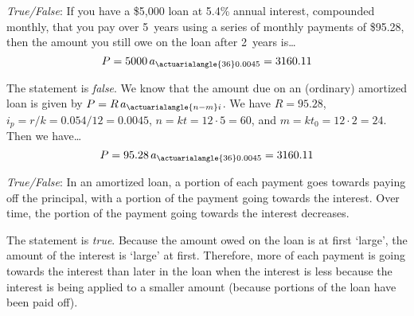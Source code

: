 \documentclass[11pt,letterpaper]{article}
\begin{document}
\newpage



\quizsol \textit{True/False}: If you have a \$5,000 loan at 5.4\% annual interest, compounded monthly, that you pay over 5~years using a series of monthly payments of \$95.28, then the amount you still owe on the loan after 2~years is\dots
	\[
	P= 5000\, a_{\actuarialangle{36}0.0045}= 3160.11
	\] \pspace

\sol The statement is \textit{false}. We know that the amount due on an (ordinary) amortized loan is given by $P= R\, a_{\actuarialangle{n - m}i}$. We have $R= 95.28$, $i_p= r/k= 0.054/12= 0.0045$, $n= kt= 12 \cdot 5= 60$, and $m= kt_0= 12 \cdot 2= 24$. Then we have\dots
	\[
	P= 95.28\, a_{\actuarialangle{36}0.0045}= 3160.11
	\] \pvspace{1.3cm}



\quizsol \textit{True/False}: In an amortized loan, a portion of each payment goes towards paying off the principal, with a portion of the payment going towards the interest. Over time, the portion of the payment going towards the interest decreases. \pspace

\sol The statement is \textit{true}. Because the amount owed on the loan is at first `large', the amount of the interest is `large' at first. Therefore, more of each payment is going towards the interest than later in the loan when the interest is less because the interest is being applied to a smaller amount (because portions of the loan have been paid off). 
\end{document}
